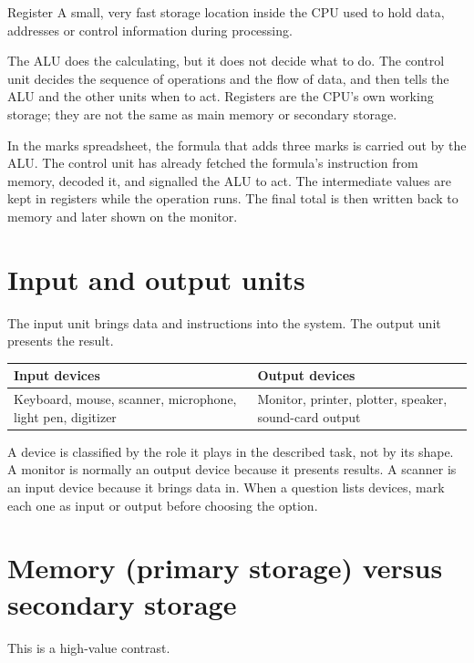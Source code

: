 \begin{definitionbox}{Register}
A small, very fast storage location inside the CPU used to hold data,
addresses or control information during processing.
\end{definitionbox}

The ALU does the calculating, but it does not decide what to do. The control
unit decides the sequence of operations and the flow of data, and then tells
the ALU and the other units when to act. Registers are the CPU's own working
storage; they are not the same as main memory or secondary storage.

\begin{example}
In the marks spreadsheet, the formula that adds three marks is carried out by
the ALU. The control unit has already fetched the formula's instruction from
memory, decoded it, and signalled the ALU to act. The intermediate values are
kept in registers while the operation runs. The final total is then written
back to memory and later shown on the monitor.
\end{example}

\section{Input and output units}
The input unit brings data and instructions into the system. The output unit
presents the result.

\begin{center}
\begin{tabular}{p{}p{}}
\toprule
\textbf{Input devices} & \textbf{Output devices}\\
\midrule
Keyboard, mouse, scanner, microphone, light pen, digitizer & Monitor,
printer, plotter, speaker, sound-card output\\
\bottomrule
\end{tabular}
\end{center}

A device is classified by the role it plays in the described task, not by its
shape. A monitor is normally an output device because it presents results. A
scanner is an input device because it brings data in. When a question lists
devices, mark each one as input or output before choosing the option.

\section{Memory (primary storage) versus secondary storage}
This is a high-value contrast.

